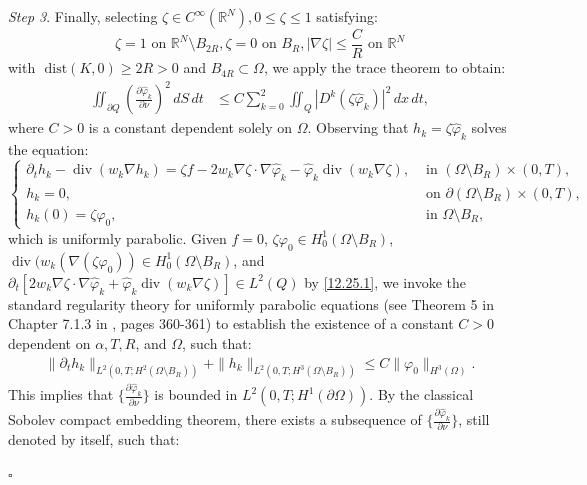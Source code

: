 \documentclass[11pt]{article}
\newenvironment{proof}{{\bf {Proof.}}}{\hfill $\square$}
\numberwithin{equation}{section}
\def\bf{\textbf}
\DeclareMathOperator{\Div}{div}
\begin{document}
\begin{proof}
{\it Step 3}. Finally, selecting $\zeta \in C^\infty(\mathbb{R}^N), 0 \leq \zeta \leq 1$ satisfying:
\begin{equation*}
\zeta = 1   \text{ on } \mathbb{R}^N \setminus B_{2R},   \zeta = 0   \text{ on } B_R,   |\nabla \zeta| \leq \frac{C}{R}   \text{ on } \mathbb{R}^N
\end{equation*}
with $\text{ dist}(K,0) \geq 2R > 0$ and $B_{4R} \subset \Omega$, we apply the trace theorem to obtain:
\begin{equation}\label{12.22.2}
\begin{split}
\iint_{\partial Q} \left( \frac{\partial \widehat{\varphi}_k}{\partial \nu} \right)^2 \, dS \, dt
&\leq C \sum_{k=0}^2 \iint_Q \left| D^k (\zeta \widehat{\varphi}_k) \right|^2 \, dx \, dt,
\end{split}
\end{equation}
where $C > 0$ is a constant dependent solely on $\Omega$. Observing that $h_k = \zeta \widehat{\varphi}_k$ solves the equation:
\begin{equation*}
\begin{cases}
\partial_t h_k - \Div(w_k \nabla h_k) = \zeta f - 2w_k \nabla \zeta \cdot \nabla \widehat{\varphi}_k - \widehat{\varphi}_k \Div(w_k \nabla \zeta), &\text{ in } (\Omega \setminus B_R) \times (0,T), \\
h_k = 0, &\text{ on } \partial (\Omega \setminus B_R) \times (0,T), \\
h_k(0) = \zeta \varphi_0, &\text{ in } \Omega \setminus B_R,
\end{cases}
\end{equation*}
which is uniformly parabolic. Given $f = 0$, $\zeta \varphi_0 \in H_0^1(\Omega \setminus B_R)$, $\Div(w_k (\nabla (\zeta \varphi_0)) \in H_0^1(\Omega \setminus B_R)$, and $\partial_t [2w_k \nabla \zeta \cdot \nabla \widehat{\varphi}_k + \widehat{\varphi}_k \Div(w_k \nabla \zeta)] \in L^2(Q)$ by \eqref{12.25.1}, we invoke the standard regularity theory for uniformly parabolic equations (see Theorem 5 in Chapter 7.1.3 in \cite{Evans}, pages 360-361) to establish the existence of a constant $C > 0$ dependent on $\alpha, T, R$, and $\Omega$, such that:
\begin{equation}\label{12.25.2}
\begin{split}
\|\partial_t h_k\|_{L^2(0,T; H^2(\Omega \setminus B_R))} + \|h_k\|_{L^2(0,T; H^3(\Omega \setminus B_R))}
\leq C \|\varphi_0\|_{H^3(\Omega)}.
\end{split}
\end{equation}
This implies that $\{\frac{\partial \widehat{\varphi}_k}{\partial \nu}\}$ is bounded in $L^2(0,T; H^1(\partial \Omega))$. By the classical Sobolev compact embedding theorem, there exists a subsequence of $\{\frac{\partial \widehat{\varphi}_k}{\partial \nu}\}$, still denoted by itself, such that:

\end{proof}
\end{document}
